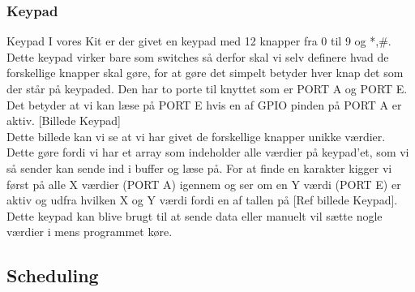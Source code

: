 \subsubsection{Keypad}

Keypad
I vores Kit er der givet en keypad med 12 knapper fra 0 til 9 og *,\#. Dette keypad virker bare som switches så derfor skal vi selv definere hvad de forskellige knapper skal gøre, for at gøre det simpelt betyder hver knap det som der står på keypaded. Den har to porte til knyttet som er PORT A og PORT E. Det betyder at vi kan læse på PORT E hvis en af GPIO pinden på PORT A er aktiv. [Billede Keypad]
\\
Dette billede kan vi se at vi har givet de forskellige knapper unikke værdier. Dette gøre fordi vi har et array som indeholder alle værdier på keypad’et, som vi så sender kan sende ind i buffer og læse på. For at finde en karakter kigger vi først på alle X værdier (PORT A) igennem og ser om en Y værdi (PORT E) er aktiv og udfra hvilken X og Y værdi fordi en af tallen på  [Ref billede Keypad].
\\
Dette keypad kan blive brugt til at sende data eller manuelt vil sætte nogle værdier i mens programmet køre.


\subsection{Scheduling}